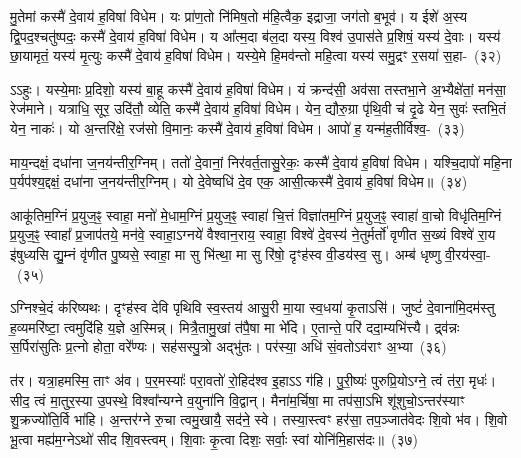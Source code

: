 मु॒तेमां कस्मै॑ दे॒वाय॑ ह॒विषा॑ विधेम। यः प्रा॑ण॒तो नि॑मिष॒तो म॑हि॒त्वैक॒ इद्राजा॒ जग॑तो ब॒भूव॑। य ईशे॑ अ॒स्य द्वि॒पद॒श्चतु॑ष्पदः॒ कस्मै॑ दे॒वाय॑ ह॒विषा॑ विधेम। य आ᳚त्म॒दा ब॑ल॒दा यस्य॒ विश्व॑ उ॒पास॑ते प्र॒शिषं॒ यस्य॑ दे॒वाः। यस्य॑ छा॒यामृतं॒ यस्य॑ मृ॒त्युः कस्मै॑ दे॒वाय॑ ह॒विषा॑ विधेम। यस्ये॒मे हि॒मव॑न्तो महि॒त्वा यस्य॑ समु॒द्रꣳ र॒सया॑ स॒हा-~(३२)\ip

ऽऽहुः। यस्ये॒माः प्र॒दिशो॒ यस्य॑ बा॒हू कस्मै॑ दे॒वाय॑ ह॒विषा॑ विधेम। यं क्रन्द॑सी॒ अव॑सा तस्तभा॒ने अ॒भ्यैक्षे॑तां॒ मन॑सा॒ रेज॑माने। यत्राधि॒ सूर॒ उदि॑तौ॒ व्येति॒ कस्मै॑ दे॒वाय॑ ह॒विषा॑ विधेम। येन॒ द्यौरु॒ग्रा पृ॑थि॒वी च॑ दृ॒ढे येन॒ सुवः॑ स्तभि॒तं येन॒ नाकः॑। यो अ॒न्तरि॑क्षे॒ रज॑सो वि॒मानः॒ कस्मै॑ दे॒वाय॑ ह॒विषा॑ विधेम। आपो॑ ह॒ यन्म॑ह॒तीर्विश्व॒-~(३३)\ip

माय॒न्दक्षं॒ दधा॑ना ज॒नय॑न्तीर॒ग्निम्। ततो॑ दे॒वानां॒ निर॑वर्त॒तासु॒रेकः॒ कस्मै॑ दे॒वाय॑ ह॒विषा॑ विधेम। यश्चि॒दापो॑ महि॒ना प॒र्यप॑श्य॒द्दक्षं॒ दधा॑ना ज॒नय॑न्तीर॒ग्निम्। यो दे॒वेष्वधि॑ दे॒व एक॒ आसी॒त्कस्मै॑ दे॒वाय॑ ह॒विषा॑ विधेम॥~(३४)\ip

{\anuvakamend[{अ॒ग्नेः स सर॑स्वती॒ द्याꣳ स॒ह विश्व॒ञ्चतु॑स्त्रिꣳशश्च}]}

आकू॑तिम॒ग्निं प्र॒युज॒ꣴ॒ स्वाहा॒ मनो॑ मे॒धाम॒ग्निं प्र॒युज॒ꣴ॒ स्वाहा॑ चि॒त्तं विज्ञा॑तम॒ग्निं प्र॒युज॒ꣴ॒ स्वाहा॑ वा॒चो विधृ॑तिम॒ग्निं प्र॒युज॒ꣴ॒ स्वाहा᳚ प्र॒जा\-प॑तये॒ मन॑वे॒ स्वाहा॒ऽग्नये॑ वैश्वान॒राय॒ स्वाहा॒ विश्वे॑ दे॒वस्य॑ ने॒तुर्मर्तो॑ वृणीत स॒ख्यं विश्वे॑ रा॒य इ॑षुध्यसि द्यु॒म्नं वृ॑णीत पु॒ष्यसे॒ स्वाहा॒ मा सु भि॑त्था॒ मा सु रि॑षो॒ दृꣳह॑स्व वी॒डय॑स्व॒ सु। अम्ब॑ धृष्णु वी॒रय॑स्वा॒-~(३५)\ip

ऽग्निश्चे॒दं क॑रिष्यथः। दृꣳह॑स्व देवि पृथिवि स्व॒स्तय॑ आसु॒री मा॒या स्व॒धया॑ कृ॒ताऽसि॑। जुष्टं॑ दे॒वाना॑मि॒दम॑स्तु ह॒व्यमरि॑ष्टा॒ त्वमुदि॑हि य॒ज्ञे अ॒स्मिन्न्। मित्रै॒तामु॒खां त॑पै॒षा मा भे॑दि। ए॒तान्ते॒ परि॑ ददा॒म्यभि॑त्त्यै। द्र्व॑न्नः स॒र्पिरा॑सुतिः प्र॒त्नो होता॒ वरे᳚ण्यः। सह॑सस्पु॒त्रो अद्भु॑तः। पर॑स्या॒ अधि॑ सं॒वतो\-ऽव॑राꣳ अ॒भ्या~(३६)\ip

त॑र। यत्रा॒हमस्मि॒ ताꣳ अ॑व। प॒र॒मस्याः᳚ परा॒वतो॑ रो॒हिद॑श्व इ॒हाऽऽ ग॑हि। पु॒री॒ष्यः॑ पुरुप्रि॒यो\-ऽग्ने॒ त्वं त॑रा॒ मृधः॑। सीद॒ त्वं मा॒तुर॒स्या उ॒पस्थे॒ विश्वा᳚न्यग्ने व॒युना॑नि वि॒द्वान्। मैना॑म॒र्चिषा॒ मा तप॑सा॒ऽभि शू॑शुचो॒\-ऽन्तर॑स्याꣳ शु॒क्रज्यो॑ति॒र्वि भा॑हि। अ॒न्तर॑ग्ने रु॒चा त्वमु॒खायै॒ सद॑ने॒ स्वे। तस्या॒स्त्वꣳ हर॑सा॒ तप॒ञ्जात॑वेदः शि॒वो भ॑व। शि॒वो भू॒त्वा मह्य॑म॒ग्ने\-ऽथो॑ सीद शि॒वस्त्वम्। शि॒वाः कृ॒त्वा दिशः॒ सर्वाः॒ स्वां योनि॑मि॒हास॑दः॥~(३७)\ip

{\anuvakamend[{वी॒रय॒स्वा तप॑न्विꣳश॒तिश्च॑}]}

